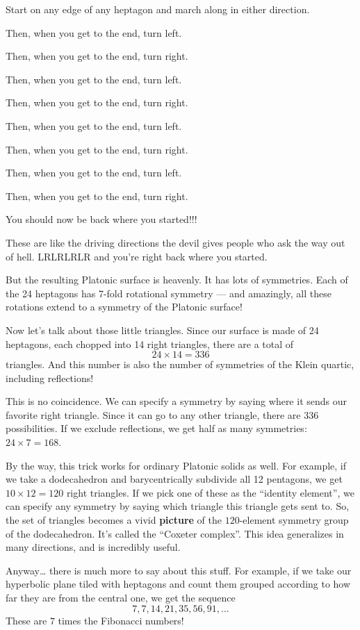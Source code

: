 \documentclass{article}
\begin{document}
Start on any edge of any heptagon and march along in either direction.

Then, when you get to the end, turn left.

Then, when you get to the end, turn right.

Then, when you get to the end, turn left.

Then, when you get to the end, turn right.

Then, when you get to the end, turn left.

Then, when you get to the end, turn right.

Then, when you get to the end, turn left.

Then, when you get to the end, turn right.

You should now be back where you started!!!

These are like the driving directions the devil gives people who ask the
way out of hell. LRLRLRLR and you're right back where you started.

But the resulting Platonic surface is heavenly. It has lots of
symmetries. Each of the 24 heptagons has 7-fold rotational symmetry ---
and amazingly, all these rotations extend to a symmetry of the Platonic
surface!

Now let's talk about those little triangles. Since our surface is made
of 24 heptagons, each chopped into 14 right triangles, there are a total
of \[24 \times 14 = 336\] triangles. And this number is also the number
of symmetries of the Klein quartic, including reflections!

This is no coincidence. We can specify a symmetry by saying where it
sends our favorite right triangle. Since it can go to any other
triangle, there are 336 possibilities. If we exclude reflections, we get
half as many symmetries: \(24 \times 7 = 168\).

By the way, this trick works for ordinary Platonic solids as well. For
example, if we take a dodecahedron and barycentrically subdivide all 12
pentagons, we get \(10 \times 12 = 120\) right triangles. If we pick one
of these as the ``identity element'', we can specify any symmetry by
saying which triangle this triangle gets sent to. So, the set of
triangles becomes a vivid \textbf{picture} of the \(120\)-element
symmetry group of the dodecahedron. It's called the ``Coxeter complex''.
This idea generalizes in many directions, and is incredibly useful.

Anyway\ldots{} there is much more to say about this stuff. For example,
if we take our hyperbolic plane tiled with heptagons and count them
grouped according to how far they are from the central one, we get the
sequence \[7, 7, 14, 21, 35, 56, 91, \ldots\] These are \(7\) times the
Fibonacci numbers!
\end{document}
